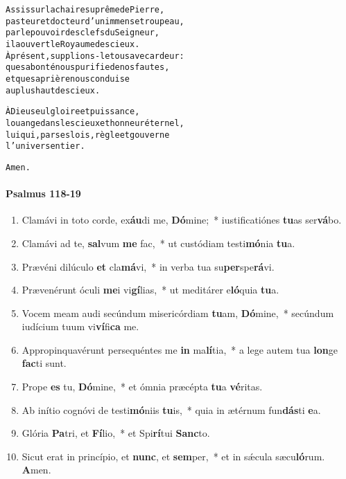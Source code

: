 \documentclass[twoside]{article}
\begin{document}
\begin{paracol}[1]{2}
\begin{alltt}
             Assis sur la chaire suprême de Pierre,
             pasteur et docteur d’un immense troupeau,
             par le pouvoir des clefs du Seigneur,
             il a ouvert le Royaume des cieux.
\newpage
             À présent, supplions-le tous avec ardeur :
             que sa bonté nous purifie de nos fautes,
             et que sa prière nous conduise
             au plus haut des cieux.
             
             À Dieu seul gloire et puissance,
             louange dans les cieux et honneur éternel,
             lui qui, par ses lois, règle et gouverne
             l’univers entier.
             
             Amen.
\end{alltt}

\switchcolumn*


\paragraph{Psalmus 118-19}


\begin{enumerate}[wide, itemsep=0mm, labelwidth=!, labelindent=0pt, label=\color{gregoriocolor}\theenumi]
\item Clamávi in toto corde, ex\textbf{áu}di me, \textbf{Dó}mine;~* iustificatiónes \textbf{tu}as ser\textbf{vá}bo.
\item Clamávi ad te, \textbf{sal}vum \textbf{me} fac,~* ut custódiam testi\textbf{mó}nia \textbf{tu}a.
\item Prævéni dilúculo \textbf{et} cla\textbf{má}vi,~* in verba tua su\textbf{per}spe\textbf{rá}vi.
\item Prævenérunt óculi \textbf{me}i vi\textbf{gí}lias,~* ut meditárer e\textbf{ló}quia \textbf{tu}a.
\item Vocem meam audi secúndum misericórdiam \textbf{tu}am, \textbf{Dó}mine,~* secúndum iudícium tuum vi\textbf{ví}fi\textbf{ca} me.
\item Appropinquavérunt persequéntes me \textbf{in} ma\textbf{lí}tia,~* a lege autem tua \textbf{lon}ge \textbf{fac}ti sunt.
\item Prope \textbf{es} tu, \textbf{Dó}mine,~* et ómnia præcépta \textbf{tu}a \textbf{vé}ritas.
\item Ab inítio cognóvi de testi\textbf{mó}niis \textbf{tu}is,~* quia in ætérnum fun\textbf{dás}ti \textbf{e}a.
\item Glória \textbf{Pa}tri, et \textbf{Fí}lio,~* et Spi\textbf{rí}tui \textbf{Sanc}to.
\item Sicut erat in princípio, et \textbf{nunc}, et \textbf{sem}per,~* et in sǽcula sæcu\textbf{ló}rum. \textbf{A}men.
\end{enumerate}


\end{paracol}
\end{document}

